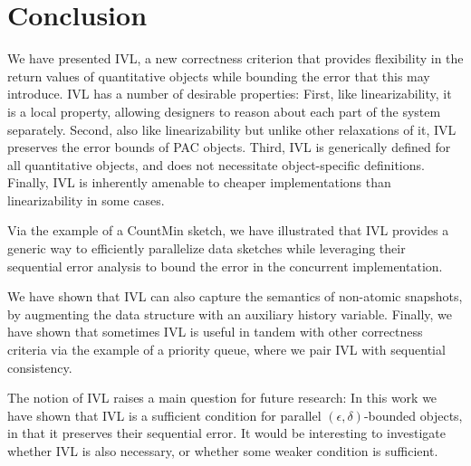 \section{Conclusion}
\label{ivl-sec:conclusion}

We have presented IVL, a new correctness criterion that provides flexibility
in the return values of quantitative objects while bounding the error that this may
introduce. IVL has a number of desirable properties: First,
like linearizability, it is a local property, allowing designers to reason about each part
of the system separately. Second, also like linearizability but unlike other relaxations of
it, IVL preserves the error bounds of PAC objects. Third, IVL is generically defined for
all quantitative objects, and does not necessitate object-specific definitions. Finally,
IVL is inherently amenable to cheaper implementations than linearizability in some cases.

Via the example of a CountMin sketch, we have illustrated that IVL provides
a generic way to efficiently parallelize data sketches while leveraging their
sequential error analysis to bound the error in the concurrent implementation.

We have shown that IVL can also capture the semantics of non-atomic snapshots,
by augmenting the data structure with an auxiliary history
variable. Finally, we have shown that sometimes IVL is useful
in tandem with other correctness criteria via the
example of a priority queue, where we pair IVL with sequential consistency.

The notion of IVL raises a main question for future research:
In this work we have shown that IVL is a sufficient condition for parallel
$(\epsilon,\delta)$-bounded objects, in that it preserves their sequential
error. It would be interesting to investigate whether IVL is also necessary,
or whether some weaker condition is sufficient.